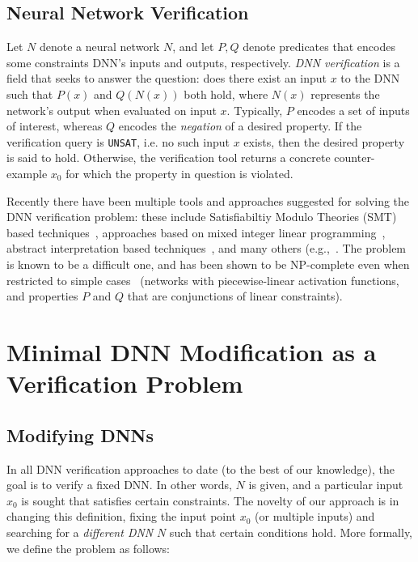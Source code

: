 \documentclass{easychair}
\newcommand{\unsat}{\texttt{UNSAT}}
\begin{document}
\subsection{Neural Network Verification}


Let $N$ denote a neural network $N$, and let $P,Q$ denote predicates
that encodes some constraints DNN's inputs and outputs, respectively.
\emph{DNN verification} is a field that seeks to answer the question:
does there exist an input $x$ to the DNN such that $P(x)$ and
$Q(N(x))$ both hold, where $N(x)$ represents the network's output when
evaluated on input $x$. Typically, $P$ encodes a set of inputs of
interest, whereas $Q$ encodes the \emph{negation} of a desired
property. If the verification query is \unsat{}, i.e. no such input
$x$ exists, then the desired property is said to hold. Otherwise, the
verification tool returns a concrete counter-example $x_0$ for which
the property in question is violated.


Recently there have been multiple tools and approaches suggested for
solving the DNN verification problem: these include Satisfiabiltiy
Modulo Theories (SMT) based
techniques~\cite{KaBaDiJuKo17Reluplex,KaHuIbJuLaLiShThWuZeDiKoBa19Marabou},
approaches based on mixed integer linear
programming~\cite{Ehlers2017,TjXiTe19}, abstract interpretation based
techniques~\cite{GeMiDrTsChVe18}, and many others
(e.g.,~\cite{HuKwWaWu17,NaKaRySaWa17}. The problem is known to be a
difficult one, and has been shown to be NP-complete even when
restricted to simple cases~\cite{KaBaDiJuKo17Reluplex} (networks with piecewise-linear activation
functions, and properties $P$ and $Q$ that are conjunctions of linear constraints).


\section{Minimal DNN Modification as a Verification Problem}
\label{sec:minimizationProblem}

\subsection{Modifying DNNs}

In all DNN verification approaches to date (to the best of our
knowledge), the goal is to verify a fixed DNN. In other words, $N$ is
given, and a particular input $x_0$ is sought that satisfies certain constraints.
The novelty of our approach is in changing this definition, fixing
the input point $x_0$ (or multiple inputs) and searching for a
\emph{different DNN} $N$ such that certain conditions hold.
More formally, we define the problem as follows:
\end{document}
